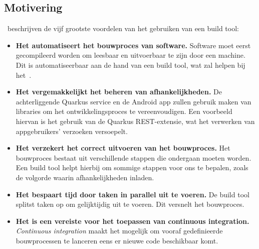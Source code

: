 \subsection{Motivering}
\label{subsec:voordelen-van-een-build-tool}
\textcite{Kandhway2019}~beschrijven de vijf grootste voordelen van het gebruiken van een build tool:
\begin{itemize}
    \item \textbf{Het automatiseert het bouwproces van software.}
    Software moet eerst gecompileerd worden om leesbaar en uitvoerbaar te zijn door een machine.
    Dit is automatiseerbaar aan de hand van een build tool, wat zal helpen bij het~.
    \item \textbf{Het vergemakkelijkt het beheren van afhankelijkheden.}
    De achterliggende Quarkus service en de Android app zullen gebruik maken van libraries om het ontwikkelingsproces te vereenvoudigen.
    Een voorbeeld hiervan is het gebruik van de Quarkus REST-extensie, wat het verwerken van appgebruikers' verzoeken versoepelt.
    \item \textbf{Het verzekert het correct uitvoeren van het bouwproces.}
    Het bouwproces bestaat uit verschillende stappen die ondergaan moeten worden.
    Een build tool helpt hierbij om sommige stappen voor ons te bepalen, zoals de volgorde waarin afhankelijkheden inladen.
    \item \textbf{Het bespaart tijd door taken in parallel uit te voeren.}
    De build tool splitst taken op om gelijktijdig uit te voeren.
    Dit versnelt het bouwproces.
    \item \textbf{Het is een vereiste voor het toepassen van continuous integration.}
    \textit{Continuous integration} maakt het mogelijk om vooraf gedefinieerde bouwprocessen te lanceren eens er nieuwe code beschikbaar komt.
\end{itemize}

